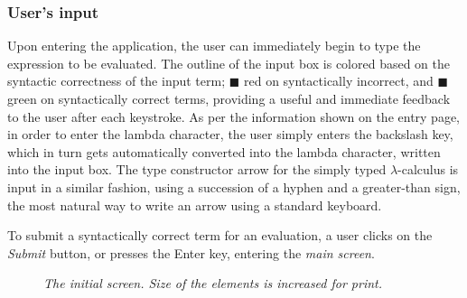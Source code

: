 \documentclass[table, a4paper, 10pt]{article}
\begin{document}
\subsubsection{User's input}\label{sec:input}
Upon entering the application, the user can immediately begin to type the expression
to be evaluated. The outline of the input box is colored based on the syntactic
correctness of the input term; {\color{synbad}$\blacksquare$} red on syntactically incorrect,
and {\color{syngood}$\blacksquare$} green on
syntactically correct terms, providing a useful and immediate feedback to the user after
each keystroke. As per the information shown on the entry page, in order to
enter the lambda character, the user simply enters the backslash key, which in turn
gets automatically converted into the lambda character, written into the input box.
The type constructor arrow for the simply typed $\lambda$-calculus is input
in a similar fashion, using a succession of a hyphen and a greater-than sign,
the most natural way to write an arrow using a standard keyboard.

To submit a syntactically correct term for an evaluation, a user clicks on the \textit{Submit} button,
or presses the Enter key, entering the \textit{main screen}.

\begin{center}
\begin{figure}[H]\centering
\setlength{\fboxsep}{0pt}%
\setlength{\fboxrule}{0.1pt}
\caption{\textit{The initial screen. Size of the elements is increased for print.}}\label{initscr}
\end{figure}
\end{center}

\noindent
\end{document}
